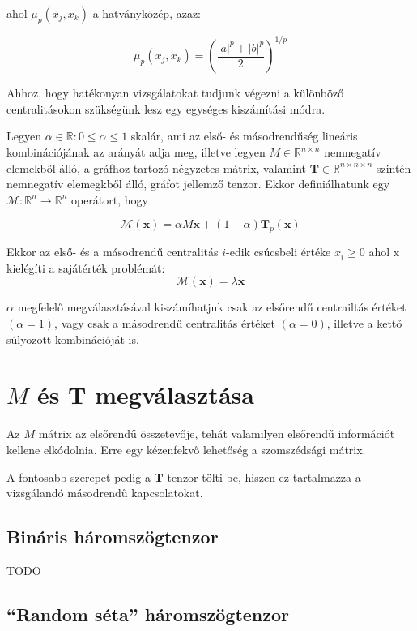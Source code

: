 \documentclass[12pt,numbers=noenddot]{report}
\begin{document}
ahol $\mu_p(x_j,x_k)$ a hatványközép, azaz:

$$\mu_p(x_j,x_k) = \left(\frac{|a|^p+|b|^p}{2}\right)^{1/p}$$


Ahhoz, hogy hatékonyan vizsgálatokat tudjunk végezni a különböző 
centralitásokon szükségünk lesz egy egységes kiszámítási módra.

Legyen $\alpha \in \mathbb{R}: 0 \leq \alpha \leq 1$ skalár, ami az első- 
és másodrendűség lineáris kombinációjának az arányát adja meg,
illetve legyen $M \in \mathbb{R}^{n \times n}$ nemnegatív elemekből álló, 
a gráfhoz tartozó négyzetes mátrix, valamint $\boldsymbol{T} \in 
\mathbb{R}^{n \times n \times n}$ szintén nemnegatív elemegkből álló, 
gráfot jellemző tenzor. Ekkor definiálhatunk egy $\mathcal{M}: 
\mathbb{R}^n \rightarrow \mathbb{R}^n$ operátort, hogy

$$\mathcal{M}(\boldsymbol{x}) = \alpha M \boldsymbol{x} + (1-\alpha) 
\boldsymbol{T}_p(\boldsymbol{x})$$

\noindent
Ekkor az első- és a másodrendű centralitás $i$-edik csúcsbeli értéke $x_i 
\geq 0$ ahol x kielégíti a sajátérték problémát:
$$\mathcal{M}(\boldsymbol{x}) = \lambda \boldsymbol{x}$$

\noindent
$\alpha$ megfelelő megválasztásával kiszámíhatjuk csak az elsőrendű 
centrailtás értéket $(\alpha = 1)$, vagy csak a másodrendű centralitás 
értéket $(\alpha = 0)$, illetve a kettő súlyozott kombinációját is.


\section{$M$ és $\boldsymbol{T}$ megválasztása}

Az $M$ mátrix az elsőrendű összetevője, tehát valamilyen elsőrendű 
információt kellene elkódolnia. 
Erre egy kézenfekvő lehetőség a szomszédsági mátrix.

A fontosabb szerepet pedig a $\boldsymbol{T}$ tenzor tölti be, hiszen ez 
tartalmazza a vizsgálandó másodrendű kapcsolatokat.

\subsection*{Bináris háromszögtenzor}

TODO

\subsection*{``Random séta'' háromszögtenzor}
\end{document}
